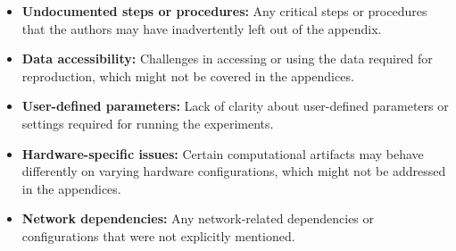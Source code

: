 \documentclass[sigconf]{acmart}
\begin{document}
\begin{aerhint}
\begin{itemize}
\begin{itemize}
        \item \textbf{Undocumented steps or procedures:} Any critical steps or procedures that the authors may have inadvertently left out of the appendix.
        \item \textbf{Data accessibility:} Challenges in accessing or using the data required for reproduction, which might not be covered in the appendices.
        \item \textbf{User-defined parameters:} Lack of clarity about user-defined parameters or settings required for running the experiments.
        \item \textbf{Hardware-specific issues:} Certain computational artifacts may behave differently on varying hardware configurations, which might not be addressed in the appendices.
        \item \textbf{Network dependencies:} Any network-related dependencies or configurations that were not explicitly mentioned.
    \end{itemize}
\end{itemize}
\end{aerhint}

\aerdisclaimer
\end{document}
